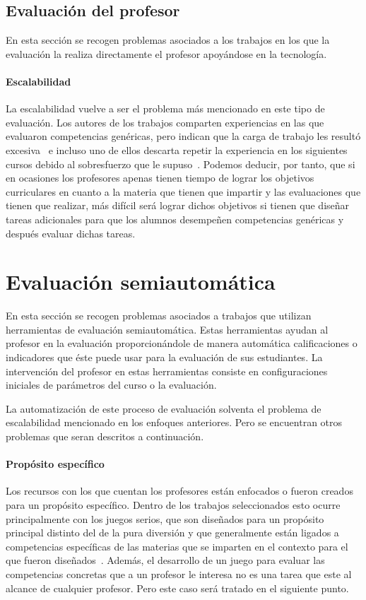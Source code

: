 \subsection{Evaluación del profesor}

En esta sección se recogen problemas asociados a los trabajos en los que la evaluación la realiza directamente el profesor apoyándose en la tecnología.

\paragraph*{Escalabilidad}
La escalabilidad vuelve a ser el problema más mencionado en este tipo de evaluación. Los autores de los trabajos comparten experiencias en las que evaluaron competencias genéricas, pero indican que la carga de trabajo les resultó excesiva~\cite{serrano2013hiperion,lacuesta2009active} e incluso uno de ellos descarta repetir la experiencia en los siguientes cursos debido al sobresfuerzo que le supuso~\cite{benlloch2007adapting}. Podemos deducir, por tanto, que si en ocasiones los profesores apenas tienen tiempo de lograr los objetivos curriculares en cuanto a la materia que tienen que impartir y las evaluaciones que tienen que realizar, más difícil será lograr dichos objetivos si tienen que diseñar tareas adicionales para que los alumnos desempeñen competencias genéricas y después evaluar dichas tareas.

\section{Evaluación semiautomática}

En esta sección se recogen problemas asociados a trabajos que utilizan herramientas de evaluación semiautomática. Estas herramientas ayudan al profesor en la evaluación proporcionándole de manera automática calificaciones o indicadores que éste puede usar para la evaluación de sus estudiantes. La intervención del profesor en estas herramientas consiste en configuraciones iniciales de parámetros del curso o la evaluación.

La automatización de este proceso de evaluación solventa el problema de escalabilidad mencionado en los enfoques anteriores. Pero se encuentran otros problemas que seran descritos a continuación.


\paragraph*{Propósito específico}
Los recursos con los que cuentan los profesores están enfocados o fueron creados para un propósito específico. Dentro de los trabajos seleccionados esto ocurre principalmente con los juegos serios, que son diseñados para un propósito principal distinto del de la pura diversión y que generalmente están ligados a competencias específicas de las materias que se imparten en el contexto para el que fueron diseñados~\cite{bedek2011behavioral,guenaga2013serious}. Además, el desarrollo de un juego para evaluar las competencias concretas que a un profesor le interesa no es una tarea que este al alcance de cualquier profesor. Pero este caso será tratado en el siguiente punto.


